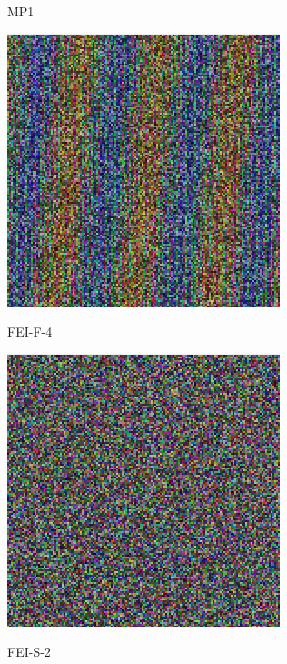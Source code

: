 \documentclass[
    parspace,
    noindent,
    nohyp,
]{elteiktdk}[2023/04/10]
\begin{document}
\begin{figure}[H]
\begin{minipage}[b]{0.23\textwidth}
    \par MP1
  \end{minipage}
  \hspace*{\fill}
  \begin{minipage}[b]{0.23\textwidth}
    \centering
    \includegraphics[width=\textwidth]{image/permutation-feif4.png}
    \par FEI-F-4
  \end{minipage}
  \hspace*{\fill}
  \begin{minipage}[b]{0.23\textwidth}
    \centering
    \includegraphics[width=\textwidth]{image/permutation-feis2.png}
    \par FEI-S-2
  \end{minipage}


\end{figure}
\end{document}
